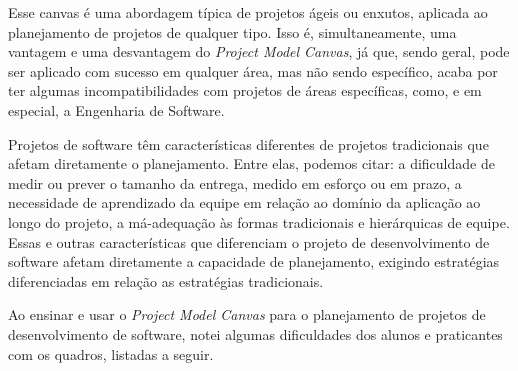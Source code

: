 \documentclass{article}
\begin{document}
Esse canvas é uma abordagem típica de projetos ágeis ou enxutos, aplicada ao planejamento de projetos de qualquer tipo. Isso é, simultaneamente, uma vantagem e uma desvantagem do \textit{Project Model Canvas}, já que, sendo geral, pode ser aplicado com sucesso em qualquer área, mas não sendo específico, acaba por ter algumas incompatibilidades com projetos de áreas específicas, como, e em especial, a Engenharia de Software.

Projetos de software têm características diferentes de projetos tradicionais que afetam diretamente o planejamento. Entre elas, podemos citar: a dificuldade de medir ou prever o tamanho da entrega, medido em esforço ou em prazo\citeauthor{mike:agile:estimating,cocomo2:manual,pressman:2019}, a necessidade de aprendizado da equipe em relação ao domínio da aplicação ao longo do projeto, a má-adequação às formas tradicionais e hierárquicas de equipe\citep{Constantine1993}. Essas e outras características que diferenciam o projeto de desenvolvimento de software afetam diretamente a capacidade de planejamento, exigindo estratégias diferenciadas em relação as estratégias tradicionais.

Ao ensinar e usar o \textit{Project Model Canvas} para o planejamento de projetos de desenvolvimento de software, notei algumas dificuldades dos alunos e praticantes com os quadros, listadas a seguir.
\end{document}
